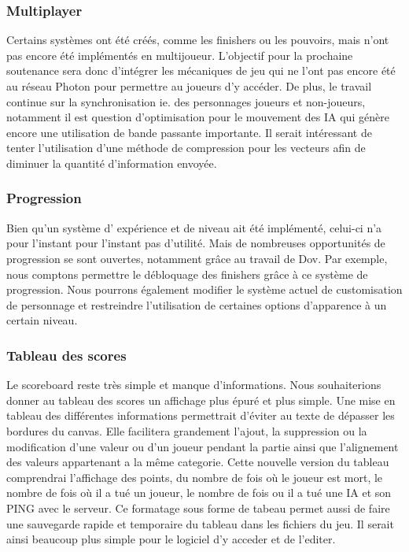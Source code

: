 	\subsubsection{Multiplayer}
	Certains systèmes ont été créés, comme les finishers ou les pouvoirs, mais n'ont pas encore été 
	implémentés en multijoueur. L'objectif pour la prochaine soutenance sera donc d'intégrer les mécaniques 
	de jeu qui ne l'ont pas encore été au réseau Photon pour permettre au joueurs d'y accéder. De plus, le 
	travail continue sur la synchronisation ie. des personnages joueurs et non-joueurs, notamment il est 
	question d'optimisation pour le mouvement des IA qui génère encore une utilisation de bande passante importante. 
	Il serait intéressant de tenter l'utilisation d'une méthode de compression pour les vecteurs afin de diminuer 
	la quantité d'information envoyée.

	\subsubsection{Progression}
		Bien qu'un système d' expérience et de niveau ait été implémenté, celui-ci n'a pour l'instant pour 
		l'instant pas d'utilité. Mais de nombreuses opportunités de progression se sont ouvertes, 
		notamment grâce au travail de Dov. Par exemple, nous comptons permettre le débloquage des 
		finishers grâce à ce système de progression. Nous pourrons également modifier le système actuel 
		de customisation de personnage et restreindre l'utilisation de certaines options d'apparence à un certain niveau.

    \subsubsection{Tableau des scores}
    Le scoreboard reste très simple et manque d’informations. Nous souhaiterions donner au tableau des scores un affichage plus épuré et plus simple. Une mise en tableau des différentes informations permettrait d’éviter au texte de dépasser les bordures du canvas. Elle facilitera grandement l’ajout, la suppression ou la modification d’une valeur ou d’un joueur pendant la partie ainsi que l’alignement des valeurs appartenant a la même categorie. 
    Cette nouvelle version du tableau comprendrai l'affichage des points, du nombre de fois où le joueur est mort, le nombre de fois où il a tué un joueur, le nombre de fois ou il a tué une IA et son PING avec le serveur. Ce formatage sous forme de tabeau permet aussi de faire une sauvegarde rapide et temporaire du tableau dans les fichiers du jeu. Il serait ainsi beaucoup plus simple pour le logiciel d'y acceder et de l'editer.
    
